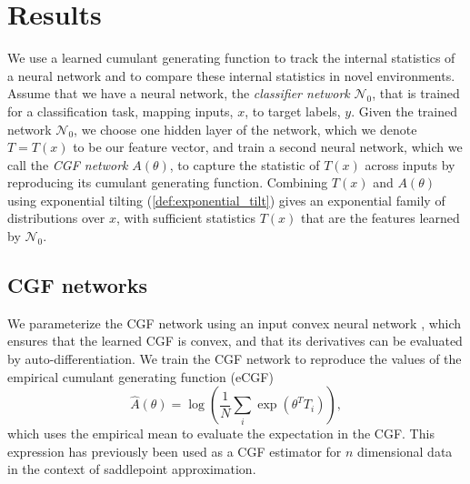 \documentclass{article}      %
\begin{document}
\section{Results}

We use a learned cumulant generating function to track the internal statistics of a neural network and to compare these internal statistics in novel environments.
Assume that we have a neural network, the \textit{classifier network} $\mathcal{N}_0$, that is trained for a classification task, mapping inputs, $x$, to target labels, $y$.
Given the trained network $\mathcal{N}_0$, we choose one hidden layer of the network, which we denote $T=T(x)$ to be our feature vector, and train a second neural network, which we call the \textit{CGF network} $A(\theta)$, to capture the statistic of $T(x)$ across inputs by reproducing its cumulant generating function. 
Combining $T(x)$ and $A(\theta)$ using exponential tilting (\ref{def:exponential_tilt}) gives an exponential family of distributions over $x$, with sufficient statistics $T(x)$ that are the features learned by $\mathcal{N}_0$.

\subsection{CGF networks}
We parameterize the CGF network using an input convex neural network \cite{amos_input_2017,hoedt_principled_2023}, which ensures that the learned CGF is convex, and that its derivatives can be evaluated by auto-differentiation.
We train the CGF network to reproduce the values of the empirical cumulant generating function (eCGF)
\begin{equation}
  \hat A(\theta) = \log \left( \frac{1}{N}\sum_{i} \exp(\theta^T T_i) \right), \label{def:empirical_CGF}
\end{equation}
which uses the empirical mean to evaluate the expectation in the CGF. 
This expression has previously been used as a CGF estimator for $n$ dimensional data \cite{davison_saddlepoint_1988,ronchetti_empirical_1994} in the context of saddlepoint approximation.
\end{document}
